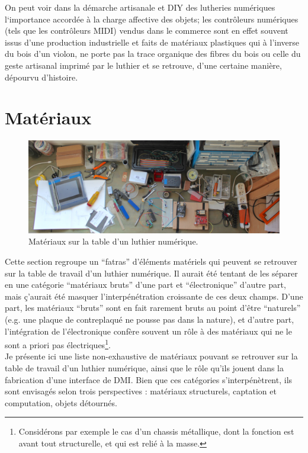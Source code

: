 \noindent On peut voir dans la démarche artisanale et \gls{DIY} des lutheries numériques l`importance accordée à la charge affective des objets; les contrôleurs numériques (tels que les contrôleurs \gls{MIDI}) vendus dans le commerce sont en effet souvent issus d'une production industrielle et faits de matériaux plastiques qui à l'inverse du bois d'un violon, ne porte pas la trace organique des fibres du bois ou celle du geste artisanal imprimé par le luthier et se retrouve, d'une certaine manière, dépourvu d'histoire.


\section{Matériaux}
\label{sec:interfaces:materials}

\begin{figure}[!htbp]
	\captionsetup{format=plain}%
	\includegraphics[width=\textwidth]{gfx/05_interfaces/lutherie-worktable.jpg}
	\caption[Matériaux sur la table d'un luthier numérique]{Matériaux sur la table d'un luthier numérique.}
	\label{fig:interface:table-luthier}
\end{figure}

\noindent Cette section regroupe un ``fatras'' d'éléments matériels qui peuvent se retrouver sur la table de travail d'un luthier numérique. Il aurait été tentant de les séparer en une catégorie ``matériaux bruts'' d'une part et ``électronique'' d'autre part, mais ç'aurait été masquer l'interpénétration croissante de ces deux champs. D'une part, les matériaux ``bruts'' sont en fait rarement bruts au point d'être ``naturels'' (e.g. une plaque de contreplaqué ne pousse pas dans la nature), et d'autre part, l'intégration de l'électronique confère souvent un rôle à des matériaux qui ne le sont a priori pas électriques\footnote{Considérons par exemple le cas d'un chassis métallique, dont la fonction est avant tout structurelle, et qui est relié à la masse.}.\\
\indent Je présente ici une liste non-exhaustive de matériaux pouvant se retrouver sur la table de travail d'un luthier numérique, ainsi que le rôle qu'ils jouent dans la fabrication d'une interface de \gls{DMI}. Bien que ces catégories s'interpénètrent, ils sont envisagés selon trois perspectives : matériaux structurels, captation et computation, objets détournés.

